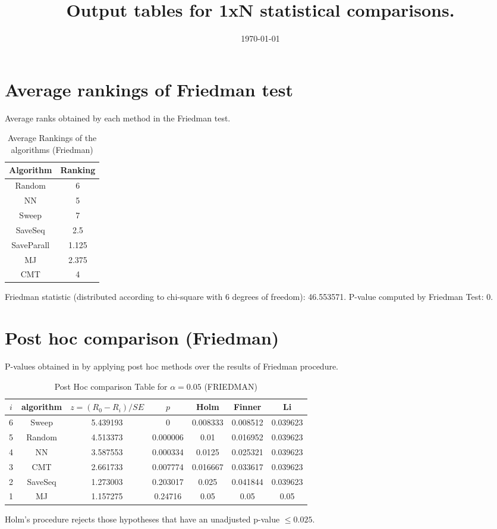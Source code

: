 \documentclass[a4paper,10pt]{article}
\title{Output tables for 1xN statistical comparisons.}
\author{}
\date{\today}
\begin{document}
\begin{landscape}
\pagestyle{empty}
\maketitle
\thispagestyle{empty}

\section{Average rankings of Friedman test}


Average ranks obtained by each method in the Friedman test.

\begin{table}[!htp]
\centering
\begin{tabular}{|c|c|}\hline
Algorithm&Ranking\\\hline
Random&6\\NN&5\\Sweep&7\\SaveSeq&2.5\\SaveParall&1.125\\MJ&2.375\\CMT&4\\\hline\end{tabular}
\caption{Average Rankings of the algorithms (Friedman)}
\end{table}

Friedman statistic (distributed according to chi-square with 6 degrees of freedom): 46.553571. \newline P-value computed by Friedman Test: 0.\newline


\newpage

\section{Post hoc comparison (Friedman)}


P-values obtained in by applying post hoc methods over the results of Friedman procedure.

\begin{table}[!htp]
\centering\footnotesize
\begin{tabular}{ccccccc}
$i$&algorithm&$z=(R_0 - R_i)/SE$&$p$&Holm &Finner&Li\\
\hline6&Sweep&5.439193&0&0.008333&0.008512&0.039623\\5&Random&4.513373&0.000006&0.01&0.016952&0.039623\\4&NN&3.587553&0.000334&0.0125&0.025321&0.039623\\3&CMT&2.661733&0.007774&0.016667&0.033617&0.039623\\2&SaveSeq&1.273003&0.203017&0.025&0.041844&0.039623\\1&MJ&1.157275&0.24716&0.05&0.05&0.05\\\hline
\end{tabular}
\caption{Post Hoc comparison Table for $\alpha=0.05$ (FRIEDMAN)}
\end{table}Holm's procedure rejects those hypotheses that have an unadjusted p-value $\le0.025$.


\end{landscape}
\end{document}
